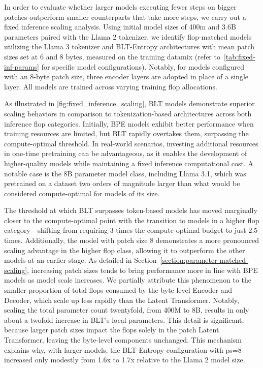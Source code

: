 In order to evaluate whether larger models executing fewer steps on bigger patches outperform smaller counterparts that take more steps, we carry out a fixed inference scaling analysis. Using initial model sizes of 400m and 3.6B parameters paired with the Llama 2 tokenizer, we identify flop-matched models utilizing the Llama 3 tokenizer and {\textsc BLT}-Entropy architectures with mean patch sizes set at 6 and 8 bytes, measured on the training datamix (refer to~\autoref{tab:fixed-inf-params} for specific model configurations). Notably, for models configured with an 8-byte patch size, three encoder layers are adopted in place of a single layer. All models are trained across varying training flop allocations.

As illustrated in \autoref{fig:fixed_inference_scaling}, {\textsc BLT} models demonstrate superior scaling behaviors in comparison to tokenization-based architectures across both inference flop categories. Initially, BPE models exhibit better performance when training resources are limited, but {\textsc BLT} rapidly overtakes them, surpassing the compute-optimal threshold. In real-world scenarios, investing additional resources in one-time pretraining can be advantageous, as it enables the development of higher-quality models while maintaining a fixed inference computational cost. A notable case is the 8B parameter model class, including Llama 3.1, which was pretrained on a dataset two orders of magnitude larger than what would be considered compute-optimal for models of its size.

The threshold at which {\textsc BLT} surpasses token-based models has moved marginally closer to the compute-optimal point with the transition to models in a higher flop category—shifting from requiring 3 times the compute-optimal budget to just 2.5 times. Additionally, the model with patch size 8 demonstrates a more pronounced scaling advantage in the higher flop class, allowing it to outperform the other models at an earlier stage. As detailed in Section~\ref{section:parameter-matched-scaling}, increasing patch sizes tends to bring performance more in line with BPE models as model scale increases. We partially attribute this phenomenon to the smaller proportion of total flops consumed by the byte-level Encoder and Decoder, which scale up less rapidly than the Latent Transformer. Notably, scaling the total parameter count twentyfold, from 400M to 8B, results in only about a twofold increase in {\textsc BLT}'s local parameters. This detail is significant, because larger patch sizes impact the flops solely in the patch Latent Transformer, leaving the byte-level components unchanged. This mechanism explains why, with larger models, the {\textsc BLT}-Entropy configuration with ps=8 increased only modestly from 1.6x to 1.7x relative to the Llama 2 model size.

